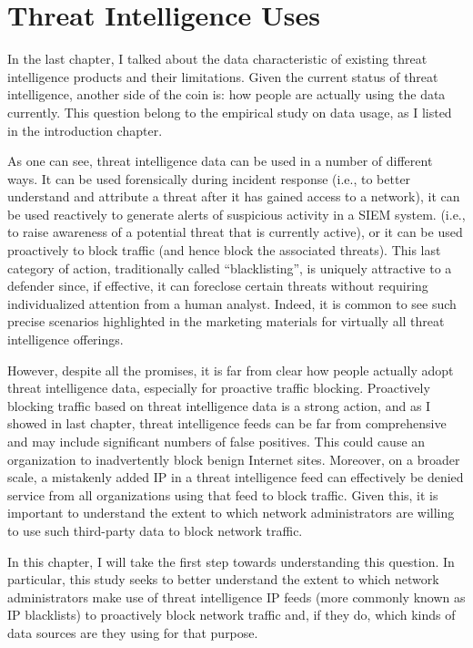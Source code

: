 \chapter{Threat Intelligence Uses}
\label{chapter:data_usage}

In the last chapter, I talked about the data characteristic of 
existing threat intelligence products and their limitations. Given
the current status of threat intelligence, another side of the coin is:
how people are actually using the data currently. This question belong 
to the empirical study on data usage, as I listed in the 
introduction chapter.

As one can see, threat intelligence data can be used in a number
of different ways. It can be used forensically during incident response
(i.e., to better understand and attribute a threat after it has gained
access to a network), it can be used reactively to generate alerts
of suspicious activity in a SIEM system. 
(i.e., to raise awareness of a potential threat
that is currently active), or it can be used proactively to block
traffic (and hence block the associated threats). This last category
of action, traditionally called ``blacklisting'', is uniquely
attractive to a defender since, if effective, it can foreclose certain
threats without requiring individualized attention from a human
analyst. Indeed, it is common to see such precise scenarios
highlighted in the marketing materials for virtually all threat
intelligence offerings.

However, despite all the promises, it is far from clear how people 
actually adopt threat intelligence data, especially for proactive
traffic blocking. Proactively blocking traffic based on threat 
intelligence data is a strong action, and as I showed in last chapter,
threat intelligence feeds can be far from comprehensive and may include
significant numbers of false positives. This could cause an organization
to inadvertently block benign Internet sites. Moreover, on a broader 
scale, a mistakenly added IP in a threat intelligence feed can
effectively be denied service from all organizations using that feed
to block traffic. Given this, it is important to understand the extent
to which network administrators are willing to use such third-party data 
to block network traffic.

In this chapter, I will take the first step towards understanding this
question. In particular, this study seeks to better understand the extent 
to which network administrators make use of threat intelligence IP feeds
(more commonly known as IP blacklists) to proactively block network 
traffic and, if they do, which kinds of data sources are they using for 
that purpose.

